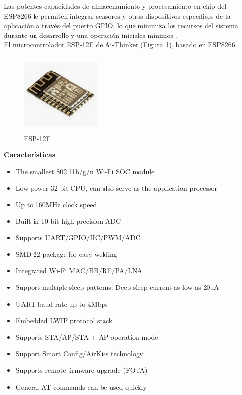     Las potentes capacidades de almacenamiento y procesamiento en chip del ESP8266 le permiten integrar sensores y otros dispositivos específicos de la aplicación a través del puerto GPIO, lo que minimiza los recursos del sistema durante un desarrollo y una operación iniciales mínimos \cite{esp12}.\\

    El microcontrolador ESP-12F de Ai-Thinker (Figura \ref{imag:esp-12F}), basado en ESP8266.

    \begin{figure}[H]
        \centering
        \includegraphics[width=4cm, height=4cm]{imagenes/esp-12F.jpeg}
        \caption{ESP-12F}
        \label{imag:esp-12F}
    \end{figure}

    \textbf{Características}

    \begin{itemize}
        \item The smallest 802.11b/g/n Wi-Fi SOC module
        \item Low power 32-bit CPU, can also serve as the application processor
        \item Up to 160MHz clock speed
        \item Built-in 10 bit high precision ADC
        \item Supports UART/GPIO/IIC/PWM/ADC
        \item SMD-22 package for easy welding
        \item Integrated Wi-Fi MAC/BB/RF/PA/LNA
        \item Support multiple sleep patterns. Deep sleep current as low as 20uA
        \item UART baud rate up to 4Mbps
        \item Embedded LWIP protocol stack
        \item Supports STA/AP/STA + AP operation mode
        \item Support Smart Config/AirKiss technology
        \item Supports remote firmware upgrade (FOTA)
        \item General AT commands can be used quickly
    \end{itemize}

